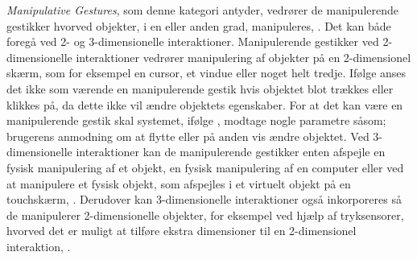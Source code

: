 %
\textit{Manipulative Gestures}, som denne kategori antyder, vedrører de manipulerende gestikker hvorved objekter, i en eller anden grad, manipuleres, \parencite[s. 5]{PDF:ATaxonomyOfGestures}. Det kan både foregå ved 2- og 3-dimensionelle interaktioner. Manipulerende gestikker ved 2-dimensionelle interaktioner vedrører manipulering af objekter på en 2-dimensionel skærm, som for eksempel en cursor, et vindue eller noget helt tredje. Ifølge \textcite[s. 5]{PDF:ATaxonomyOfGestures} anses det ikke som værende en manipulerende gestik hvis objektet blot trækkes eller klikkes på, da dette ikke vil ændre objektets egenskaber. For at det kan være en manipulerende gestik skal systemet, ifølge \textcite[s. 5]{PDF:ATaxonomyOfGestures}, modtage nogle parametre såsom; brugerens anmodning om at flytte eller på anden vis ændre objektet. Ved 3-dimensionelle interaktioner kan de manipulerende gestikker enten afspejle en fysisk manipulering af et objekt, en fysisk manipulering af en computer eller ved at manipulere et fysisk objekt, som afspejles i et virtuelt objekt på en touchskærm, \parencite[s. 6]{PDF:ATaxonomyOfGestures}. Derudover kan 3-dimensionelle interaktioner også inkorporeres så de manipulerer 2-dimensionelle objekter, for eksempel ved hjælp af tryksensorer, hvorved det er muligt at tilføre ekstra dimensioner til en 2-dimensionel interaktion, \parencite[s. 5]{PDF:ATaxonomyOfGestures}. 

